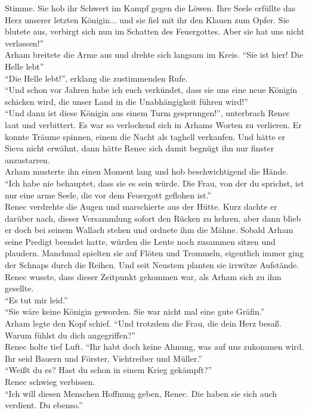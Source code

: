 Stimme. Sie hob ihr Schwert im Kampf gegen die Löwen. Ihre Seele erfüllte das Herz unserer letzten 
Königin... und sie fiel mit ihr den Klauen zum Opfer. Sie blutete aus, verbirgt sich nun im 
Schatten des Feuergottes. Aber sie hat uns nicht verlassen!''\\
Arham breitete die Arme aus und drehte sich langsam im Kreis. ``Sie ist hier! Die Helle lebt''\\
``Die Helle lebt!'', erklang die zustimmenden Rufe.\\
``Und schon vor Jahren habe ich euch verkündet, dass sie uns eine neue Königin schicken wird, die 
unser Land in die Unabhängigkeit führen wird!''\\
``Und dann ist diese Königin aus einem Turm gesprungen!'', unterbrach Renec laut und verbittert. Es 
war so verlockend sich in Arhams Worten zu verlieren. Er konnte Träume spinnen, einem die Nacht als 
taghell verkaufen. Und hätte er Sieva nicht erwähnt, dann hätte Renec sich damit begnügt ihn nur 
finster anzustarren.\\
Arham musterte ihn einen Moment lang und hob beschwichtigend die Hände. ``Ich habe nie behauptet, 
dass sie es sein würde. Die Frau, von der du sprichst, ist nur eine arme Seele, die vor dem 
Feuergott geflohen ist.''\\
Renec verdrehte die Augen und marschierte aus der Hütte. Kurz dachte er darüber nach, dieser 
Versammlung sofort den Rücken zu kehren, aber dann blieb er doch bei seinem Wallach stehen und 
ordnete ihm die Mähne. Sobald Arham seine Predigt beendet hatte, würden die Leute noch zusammen 
sitzen und plaudern. Manchmal spielten sie auf Flöten und Trommeln, eigentlich immer ging der 
Schnaps durch die Reihen. Und seit Neustem planten sie irrwitze Aufstände. Renec wusste, dass 
dieser Zeitpunkt gekommen war, als Arham sich zu ihm gesellte.\\
``Es tut mir leid.''\\
``Sie wäre keine Königin geworden. Sie war nicht mal eine gute Gräfin.''\\
Arham legte den Kopf schief. ``Und trotzdem die Frau, die dein Herz besaß. Warum fühlst du dich 
angegriffen?''\\
Renec holte tief Luft. ``Ihr habt doch keine Ahnung, was auf uns zukommen wird. Ihr seid Bauern 
und Förster, Viehtreiber und Müller.''\\
``Weißt du es? Hast du schon in einem Krieg gekämpft?''\\
Renec schwieg verbissen.\\
``Ich will diesen Menschen Hoffnung geben, Renec. Die haben sie sich auch verdient. Du ebenso.''\\
